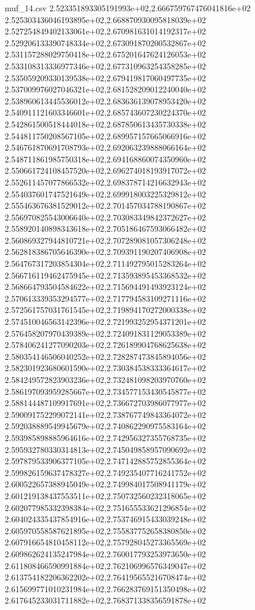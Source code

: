 \begin{filecontents*}{muf_14.csv}
2.523351893305191993e+02,2.666759767476041816e+02
2.525303436046193895e+02,2.668870930095818039e+02
2.527254849402133061e+02,2.670981631014192317e+02
2.529206133390748334e+02,2.673091870200532867e+02
2.531157288029750418e+02,2.675201647624126053e+02
2.533108313336977346e+02,2.677310963254358285e+02
2.535059209330139538e+02,2.679419817060497735e+02
2.537009976027046321e+02,2.681528209012240040e+02
2.538960613445536012e+02,2.683636139078953420e+02
2.540911121603346601e+02,2.685743607230224370e+02
2.542861500518444018e+02,2.687850613435730338e+02
2.544811750208567105e+02,2.689957157665066916e+02
2.546761870691708793e+02,2.692063239888066164e+02
2.548711861985750318e+02,2.694168860074350960e+02
2.550661724108457520e+02,2.696274018193917072e+02
2.552611457077866532e+02,2.698378714216632943e+02
2.554037601747521649e+02,2.699918003225329812e+02
2.555463676381529012e+02,2.701457034788190867e+02
2.556970825543006640e+02,2.703083349842372627e+02
2.558920140898343618e+02,2.705186467593066482e+02
2.560869327944810721e+02,2.707289081057306248e+02
2.562818386705646390e+02,2.709391190207406908e+02
2.564767317203854304e+02,2.711492795015283264e+02
2.566716119462475945e+02,2.713593895453368532e+02
2.568664793504584622e+02,2.715694491493923124e+02
2.570613339353294577e+02,2.717794583109271116e+02
2.572561757031761545e+02,2.719894170272000338e+02
2.574510046563142396e+02,2.721993252954371201e+02
2.576458207970439389e+02,2.724091831129053389e+02
2.578406241277090203e+02,2.726189904768625638e+02
2.580354146506040252e+02,2.728287473845894056e+02
2.582301923680601590e+02,2.730384538333364617e+02
2.584249572823903236e+02,2.732481098203970760e+02
2.586197093959285667e+02,2.734577153430545877e+02
2.588144487109917691e+02,2.736672703986077977e+02
2.590091752299072141e+02,2.738767749843364072e+02
2.592038889549945679e+02,2.740862290975583164e+02
2.593985898885964616e+02,2.742956327355768735e+02
2.595932780330314813e+02,2.745049858957090692e+02
2.597879533906377105e+02,2.747142885752855364e+02
2.599826159637478327e+02,2.749235407716241752e+02
2.600522657388945049e+02,2.749984017508941179e+02
2.601219138437553511e+02,2.750732560232318065e+02
2.602077985332398384e+02,2.751655533621296854e+02
2.604024335437854916e+02,2.753746915433039248e+02
2.605970558587621895e+02,2.755837752658380850e+02
2.607916654810458112e+02,2.757928045273365569e+02
2.609862624135247984e+02,2.760017793253973650e+02
2.611808466590991884e+02,2.762106996576349047e+02
2.613754182206362202e+02,2.764195655216708474e+02
2.615699771010231984e+02,2.766283769151350498e+02
2.617645233031711882e+02,2.768371338356591878e+02

\end{filecontents*}
